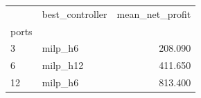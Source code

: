 \begin{tabular}{llr}
\toprule
 & best_controller & mean_net_profit \\
ports &  &  \\
\midrule
3 & milp_h6 & 208.090 \\
6 & milp_h12 & 411.650 \\
12 & milp_h6 & 813.400 \\
\bottomrule
\end{tabular}
